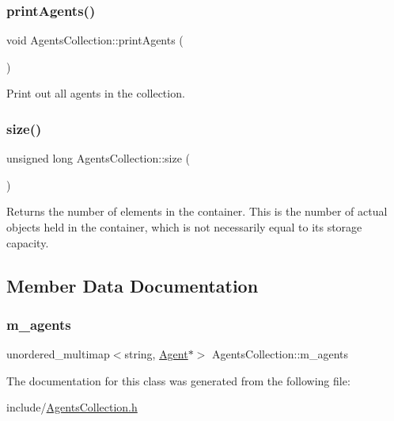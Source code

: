 \subsubsection{\texorpdfstring{print\+Agents()}{printAgents()}}
{\footnotesize\ttfamily void Agents\+Collection\+::print\+Agents (\begin{DoxyParamCaption}{ }\end{DoxyParamCaption})}

Print out all agents in the collection. \mbox{\label{class_agents_collection_a3226f7eb58b11623bdb353d8938f60d3}} 
\subsubsection{\texorpdfstring{size()}{size()}}
{\footnotesize\ttfamily unsigned long Agents\+Collection\+::size (\begin{DoxyParamCaption}{ }\end{DoxyParamCaption})}

\begin{DoxyReturn}{Returns}
the number of elements in the container. This is the number of actual objects held in the container, which is not necessarily equal to its storage capacity. 
\end{DoxyReturn}


\subsection{Member Data Documentation}
\mbox{\label{class_agents_collection_a35a5728b0e0108c2f37897720c904dd1}} 
\subsubsection{\texorpdfstring{m\+\_\+agents}{m\_agents}}
{\footnotesize\ttfamily unordered\+\_\+multimap$<$string, \hyperlink{class_agent}{Agent}$\ast$$>$ Agents\+Collection\+::m\+\_\+agents\hspace{0.3cm}{\ttfamily [private]}}



The documentation for this class was generated from the following file\+:\begin{DoxyCompactItemize}
\item 
include/\hyperlink{_agents_collection_8h}{Agents\+Collection.\+h}\end{DoxyCompactItemize}
